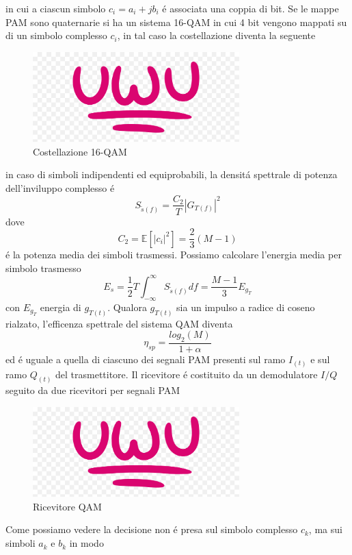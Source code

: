         in cui a ciascun simbolo $c_i = a_i +jb_i$ é associata una coppia di bit. Se le mappe PAM sono quaternarie si ha un sistema 
        16-QAM in cui 4 bit vengono mappati su di un simbolo complesso $c_i$, in tal caso la costellazione diventa la seguente
        \begin{figure}[H]
            \centering
            \includegraphics*[width = 8cm]{media/uwu.png}
            \caption{Costellazione 16-QAM}
        \end{figure}
        in caso di simboli indipendenti ed equiprobabili, la densitá spettrale di potenza dell'inviluppo complesso é 
        \[
            S_{\tilde{s}(f)} = \frac{C_2}{T}\left|G_{T(f)}\right|^2    
        \]
        dove 
        \[
            C_2 = \mathbb{E}[\left|c_i\right|^2] = \frac{2}{3}(M-1)    
        \]
        é la potenza media dei simboli trasmessi. Possiamo calcolare l'energia media per simbolo trasmesso
        \[
            E_s = \frac{1}{2}T\int_{-\infty}^{\infty}S_{\tilde{s}(f)} df = \frac{M-1}{3}E_{g_T}
        \]
        con $E_{g_T}$ energia di $g_{T(t)}$. Qualora $g_{T(t)}$ sia un impulso a radice di coseno rialzato, l'efficenza spettrale del 
        sistema QAM diventa 
        \[
            \eta_{sp} = \frac{log_2(M)}{1+\alpha}  
        \]
        ed é uguale a quella di ciascuno dei segnali PAM presenti sul ramo $I_{(t)}$ e sul ramo $Q_{(t)}$ del trasmettitore.
        Il ricevitore é costituito da un demodulatore $I/Q$ seguito da due ricevitori per segnali PAM
        \begin{figure}[H]
            \centering
            \includegraphics*[width = 8cm]{media/uwu.png}
            \caption{Ricevitore QAM}
        \end{figure}
        Come possiamo vedere la decisione non é presa sul simbolo complesso $c_k$, ma sui simboli $a_k$ e $b_k$ in modo 

